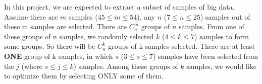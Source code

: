 In this project, we are expected to extract a subset of samples of big data. Assume there are $m$ samples ($45\leq m\leq54$), 
any $n$ ($7 \leq n\leq 25$) samples out of these m samples are selected. 
There are $C_{n}^{m}$ groups of $n$ samples. From one of these groups of n samples, we randomly selected $k$ ($4 \leq k \leq 7$) samples to form some groups. 
So there will be $C_{n}^{k}$ groups of k samples selected. There are at least \textbf{ONE} group of k samples, 
in which $s$ ($3 \leq s \leq 7$) samples have been selected from the $j$ (where $s \leq j \leq k$) samples.
Among these groups of $k$ samples, we would like to optimize them by selecting ONLY some of them.

 